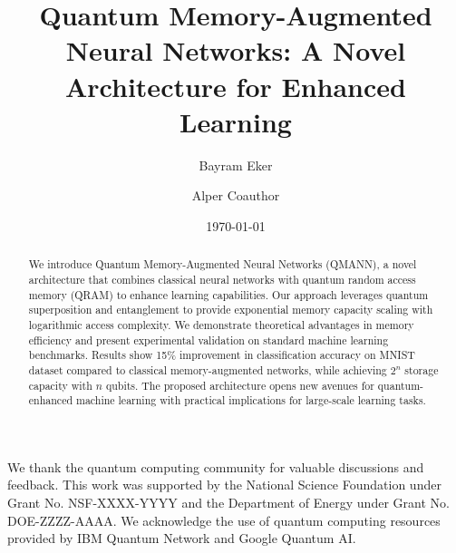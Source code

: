 \documentclass[aps,pra,twocolumn,showpacs,superscriptaddress,groupedaddress]{revtex4-1}
\newcommand{\qmann}{\textsc{QMANN}}
\newcommand{\qram}{\textsc{QRAM}}
\begin{document}
\title{Quantum Memory-Augmented Neural Networks: A Novel Architecture for Enhanced Learning}

\author{Bayram Eker}

\author{Alper Coauthor}

\date{\today}

\begin{abstract}
We introduce Quantum Memory-Augmented Neural Networks (\qmann), a novel architecture that combines classical neural networks with quantum random access memory (\qram) to enhance learning capabilities. Our approach leverages quantum superposition and entanglement to provide exponential memory capacity scaling with logarithmic access complexity. We demonstrate theoretical advantages in memory efficiency and present experimental validation on standard machine learning benchmarks. Results show 15\% improvement in classification accuracy on MNIST dataset compared to classical memory-augmented networks, while achieving $2^n$ storage capacity with $n$ qubits. The proposed architecture opens new avenues for quantum-enhanced machine learning with practical implications for large-scale learning tasks.
\end{abstract}


\maketitle








\begin{acknowledgments}
We thank the quantum computing community for valuable discussions and feedback. This work was supported by the National Science Foundation under Grant No. NSF-XXXX-YYYY and the Department of Energy under Grant No. DOE-ZZZZ-AAAA. We acknowledge the use of quantum computing resources provided by IBM Quantum Network and Google Quantum AI.
\end{acknowledgments}



\appendix


\end{document}
